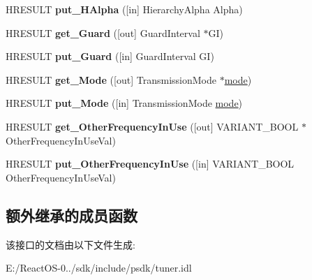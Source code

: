 \begin{DoxyCompactItemize}
H\+R\+E\+S\+U\+LT {\bfseries put\+\_\+\+H\+Alpha} (\mbox{[}in\mbox{]} Hierarchy\+Alpha Alpha)
\item 
\mbox{\label{interface_i_d_v_b_t_locator_a19bcfc5a52336488b591d4de85a1733e}} 
H\+R\+E\+S\+U\+LT {\bfseries get\+\_\+\+Guard} (\mbox{[}out\mbox{]} Guard\+Interval $\ast$GI)
\item 
\mbox{\label{interface_i_d_v_b_t_locator_a97e2d7f9e357af49232d06e469134e46}} 
H\+R\+E\+S\+U\+LT {\bfseries put\+\_\+\+Guard} (\mbox{[}in\mbox{]} Guard\+Interval GI)
\item 
\mbox{\label{interface_i_d_v_b_t_locator_a72e543629e0c691fb4b624e7ba3585dd}} 
H\+R\+E\+S\+U\+LT {\bfseries get\+\_\+\+Mode} (\mbox{[}out\mbox{]} Transmission\+Mode $\ast$\hyperlink{interfacevoid}{mode})
\item 
\mbox{\label{interface_i_d_v_b_t_locator_aa92f629f10a9ed14fc3c1537bf0e656c}} 
H\+R\+E\+S\+U\+LT {\bfseries put\+\_\+\+Mode} (\mbox{[}in\mbox{]} Transmission\+Mode \hyperlink{interfacevoid}{mode})
\item 
\mbox{\label{interface_i_d_v_b_t_locator_a277dabdd7f6435444a0b3a4092465f40}} 
H\+R\+E\+S\+U\+LT {\bfseries get\+\_\+\+Other\+Frequency\+In\+Use} (\mbox{[}out\mbox{]} V\+A\+R\+I\+A\+N\+T\+\_\+\+B\+O\+OL $\ast$Other\+Frequency\+In\+Use\+Val)
\item 
\mbox{\label{interface_i_d_v_b_t_locator_a3f0bf1a1bebfa2509f9f133499ae6826}} 
H\+R\+E\+S\+U\+LT {\bfseries put\+\_\+\+Other\+Frequency\+In\+Use} (\mbox{[}in\mbox{]} V\+A\+R\+I\+A\+N\+T\+\_\+\+B\+O\+OL Other\+Frequency\+In\+Use\+Val)
\end{DoxyCompactItemize}
\subsection*{额外继承的成员函数}


该接口的文档由以下文件生成\+:\begin{DoxyCompactItemize}
\item 
E\+:/\+React\+O\+S-\/0../sdk/include/psdk/tuner.\+idl\end{DoxyCompactItemize}
